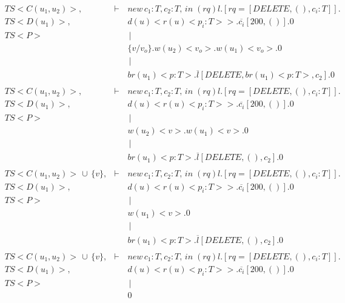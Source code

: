 \begin{eqnarray*}
 \ TS<C(u_1,u_2)>, &\vdash\,& new\,c_1:T,c_2:T,\,in\; (rq)l.[rq = [DELETE,(),c_i:T]].\\
 \ TS<D(u_1)>,   &        & d(u)<r(u)<p_i:T>>.\overline{c_i}[200,()].0         \\
 \ TS<P>         &        &    \,|\,      \\
 \               &        & \{v / v_o \}.w(u_2)<v_o>.w(u_1)<v_o>.0 \\
 \               &        &    \,|\,      \\
 \               &        &  br(u_1)<p:T>.\overline{l}[DELETE,br(u_1)<p:T>,c_2].0 \\
 \               &        &          \\
 \ TS<C(u_1,u_2)>, &\vdash\,& new\,c_1:T,c_2:T,\,in\; (rq)l.[rq = [DELETE,(),c_i:T]].\\
 \ TS<D(u_1)>,   &        & d(u)<r(u)<p_i:T>>.\overline{c_i}[200,()].0         \\
 \ TS<P>         &        &    \,|\,      \\
 \               &        & w(u_2)<v>.w(u_1)<v>.0 \\
 \               &        &    \,|\,      \\
 \               &        &  br(u_1)<p:T>.\overline{l}[DELETE,(),c_2].0 \\
 \               &        &          \\
 \ TS<C(u_1,u_2)>\,\cup\,\{v\}, &\vdash\,& new\,c_1:T,c_2:T,\,in\; (rq)l.[rq = [DELETE,(),c_i:T]]. \\
 \ TS<D(u_1)>,   &        & d(u)<r(u)<p_i:T>>.\overline{c_i}[200,()].0         \\
 \ TS<P>         &        &    \,|\,      \\
 \               &        & w(u_1)<v>.0 \\
 \               &        &    \,|\,      \\
 \               &        &  br(u_1)<p:T>.\overline{l}[DELETE,(),c_2].0 \\
 \               &        &          \\
 \ TS<C(u_1,u_2)>\,\cup\,\{v\}, &\vdash\,& new\,c_1:T,c_2:T,\,in\; (rq)l.[rq = [DELETE,(),c_i:T]]. \\
 \ TS<D(u_1)>,   &        & d(u)<r(u)<p_i:T>>.\overline{c_i}[200,()].0         \\
 \ TS<P>         &        &    \,|\,      \\
 \               &        & 0 \\

\end{eqnarray*}
